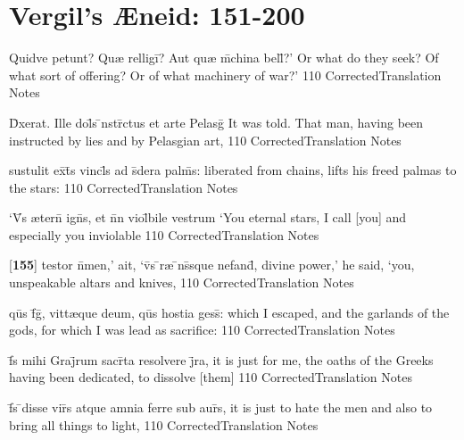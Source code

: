 \section{Vergil's {\AE}neid: 151-200} %

\latline
  {Quidve petunt?  Qu{\ae} relligi\={}?  Aut qu{\ae} m\={}china bell\={\macron {\i}}?'}
  { Or what do they seek?  Of what sort of offering?  Or of what machinery of war?' }
  {110}
  { CorrectedTranslation }
  { Notes }


\latline
  {D\={\macron {\i}}xerat.  Ille dol\={\macron {\i}}s \={\macron {\i}}nstr\={}ctus et arte Pelasg\={}}
  { It was told.  That man, having been instructed by lies and by Pelasgian art,  }
  {110}
  { CorrectedTranslation }
  { Notes }


\latline
  {sustulit ex\={}t\={}s vincl\={\macron {\i}}s ad s\={\macron {\i}}dera palm\={}s:}
  { liberated from chains, lifts his freed palmas to the stars: }
  {110}
  { CorrectedTranslation }
  { Notes }


\latline
  {`V\={}s {\ae}tern\={\macron {\i}} ign\={}s, et n\={}n viol\={}bile vestrum}
  { `You eternal stars, I call [you] and especially you inviolable  }
  {110}
  { CorrectedTranslation }
  { Notes }


\latline
  {[\textbf{155}] testor n\={}men,' ait, `v\={}s \={}r{\ae} \={}ns\={}sque nefand\={\macron {\i}},}
  { divine power,' he said, `you, unspeakable altars and knives,  }
  {110}
  { CorrectedTranslation }
  { Notes }


\latline
  {qu\={}s f\={}g\={\macron {\i}}, vitt{\ae}que deum, qu\={}s hostia gess\={\macron {\i}}:}
  { which I escaped, and the garlands of the gods, for which I was lead as sacrifice:  }
  {110}
  { CorrectedTranslation }
  { Notes }


\latline
  {f\={}s mihi Graj\={}rum sacr\={}ta resolvere j\={}ra,}
  { it is just for me, the oaths of the Greeks having been dedicated, to dissolve [them] }
  {110}
  { CorrectedTranslation }
  { Notes }


\latline
  {f\={}s \={}disse vir\={}s atque amnia ferre sub aur\={}s,}
  { it is just to hate the men and also to bring all things to light, }
  {110}
  { CorrectedTranslation }
  { Notes }


